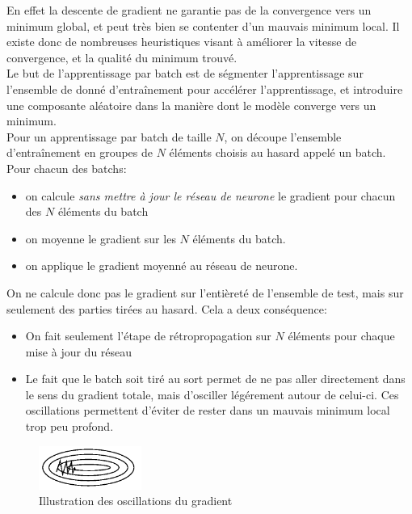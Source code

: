 En effet la descente de gradient ne garantie pas de la convergence vers un minimum global, et peut très bien se contenter d'un mauvais minimum local.
Il existe donc de nombreuses heuristiques visant à améliorer la vitesse de convergence, et la qualité du minimum trouvé.
\\
Le but de l'apprentissage par batch est de ségmenter l'apprentissage sur l'ensemble de donné d'entraînement pour accélérer l'apprentissage, et introduire une 
composante aléatoire dans la manière dont le modèle converge vers un minimum.\\
Pour un apprentissage par batch de taille $N$, on découpe l'ensemble d'entraînement en groupes de $N$ éléments choisis au hasard  appelé un batch.\\
Pour chacun des batchs:
\begin{itemize}
 \item on calcule \textit{sans mettre à jour le réseau de neurone} le gradient pour chacun des $N$ éléments du batch
 \item on moyenne le gradient sur les $N$ éléments du batch.
 \item on applique le gradient moyenné au réseau de neurone.
\end{itemize}

On ne calcule donc pas le gradient sur l'entièreté de l'ensemble de test, mais sur seulement des parties tirées au hasard.
Cela a deux conséquence: 
\begin{itemize}
 \item On fait seulement l'étape de rétropropagation sur $N$ éléments pour chaque mise à jour du réseau
 \item Le fait que le batch soit tiré au sort permet de ne pas aller directement dans le sens du gradient totale, mais d'osciller légérement autour de celui-ci.
 Ces oscillations permettent d'éviter de rester dans un mauvais minimum local trop peu profond.
\end{itemize}

\begin{figure}[h]
 \centering
 \includegraphics[width=0.3\textwidth]{img/oscillations_stochastique.png}
 \caption{Illustration des oscillations du gradient}
 \label{fig:oscillations_stochastique.png}
\end{figure}

